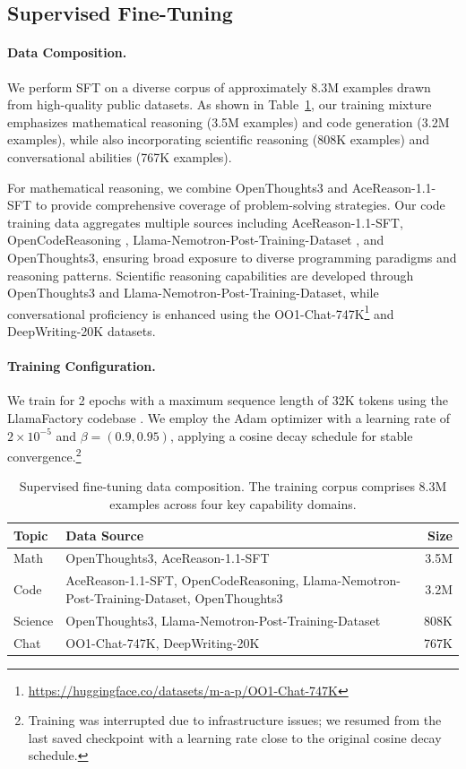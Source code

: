 \documentclass[]{bytedance_seed}
\newcommand{\1}{\mathbf{1}}
\begin{document}
\subsection{Supervised Fine-Tuning}


\paragraph{Data Composition.} We perform SFT on a diverse corpus of approximately 8.3M examples drawn from high-quality public datasets. As shown in Table~\ref{tab:sft_data}, our training mixture emphasizes mathematical reasoning (3.5M examples) and code generation (3.2M examples), while also incorporating scientific reasoning (808K examples) and conversational abilities (767K examples). 

For mathematical reasoning, we combine OpenThoughts3 \citep{guha2025openthoughts} and AceReason-1.1-SFT \citep{liu2025acereason} to provide comprehensive coverage of problem-solving strategies. Our code training data aggregates multiple sources including AceReason-1.1-SFT, OpenCodeReasoning \citep{ahmad2025opencodereasoning}, Llama-Nemotron-Post-Training-Dataset \citep{bercovich2025llama}, and OpenThoughts3, ensuring broad exposure to diverse programming paradigms and reasoning patterns. Scientific reasoning capabilities are developed through OpenThoughts3 and Llama-Nemotron-Post-Training-Dataset, while conversational proficiency is enhanced using the OO1-Chat-747K\footnote{\url{https://huggingface.co/datasets/m-a-p/OO1-Chat-747K}} and DeepWriting-20K \citep{wang2025reverse} datasets.

\paragraph{Training Configuration.} We train for 2 epochs with a maximum sequence length of 32K tokens using the LlamaFactory codebase \citep{zheng2024llamafactory}. We employ the Adam optimizer with a learning rate of $2 \times 10^{-5}$ and $\beta = (0.9, 0.95)$, applying a cosine decay schedule for stable convergence.\footnote{Training was interrupted due to infrastructure issues; we resumed from the last saved checkpoint with a learning rate close to the original cosine decay schedule.}

\begin{table}[htbp]
    \caption{Supervised fine-tuning data composition. The training corpus comprises 8.3M examples across four key capability domains.}
    \label{tab:sft_data}
    \centering
    \begin{tabular}{l|p{10cm}|r}
    \toprule
       Topic  & Data Source & Size \\ \midrule
    Math   &  OpenThoughts3, AceReason-1.1-SFT & 3.5M \\
    Code   & AceReason-1.1-SFT, OpenCodeReasoning, Llama-Nemotron-Post-Training-Dataset, OpenThoughts3 & 3.2M \\ 
    Science & OpenThoughts3, Llama-Nemotron-Post-Training-Dataset & 808K \\
    Chat & OO1-Chat-747K, DeepWriting-20K & 767K \\ \bottomrule
    \end{tabular}
\end{table}
\end{document}

